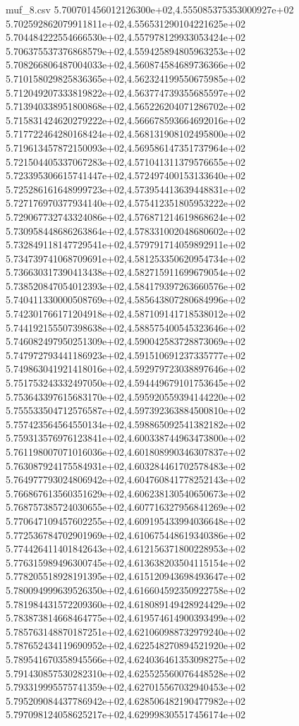 \begin{filecontents*}{muf_8.csv}
5.700701456012126300e+02,4.555085375353000927e+02
5.702592862079911811e+02,4.556531290104221625e+02
5.704484222554666530e+02,4.557978129933053424e+02
5.706375537376868579e+02,4.559425894805963253e+02
5.708266806487004033e+02,4.560874584689736366e+02
5.710158029825836365e+02,4.562324199550675985e+02
5.712049207333819822e+02,4.563774739355685597e+02
5.713940338951800868e+02,4.565226204071286702e+02
5.715831424620279222e+02,4.566678593664692016e+02
5.717722464280168424e+02,4.568131908102495800e+02
5.719613457872150093e+02,4.569586147351737964e+02
5.721504405337067283e+02,4.571041311379576655e+02
5.723395306615741447e+02,4.572497400153133640e+02
5.725286161648999723e+02,4.573954413639448831e+02
5.727176970377934140e+02,4.575412351805953222e+02
5.729067732743324086e+02,4.576871214619868624e+02
5.730958448686263864e+02,4.578331002048680602e+02
5.732849118147729541e+02,4.579791714059892911e+02
5.734739741068709691e+02,4.581253350620954734e+02
5.736630317390413438e+02,4.582715911699679054e+02
5.738520847054012393e+02,4.584179397263660576e+02
5.740411330000508769e+02,4.585643807280684996e+02
5.742301766171204918e+02,4.587109141718538012e+02
5.744192155507398638e+02,4.588575400545323646e+02
5.746082497950251309e+02,4.590042583728873069e+02
5.747972793441186923e+02,4.591510691237335777e+02
5.749863041921418016e+02,4.592979723038897646e+02
5.751753243332497050e+02,4.594449679101753645e+02
5.753643397615683170e+02,4.595920559394144220e+02
5.755533504712576587e+02,4.597392363884500810e+02
5.757423564564550134e+02,4.598865092541382182e+02
5.759313576976123841e+02,4.600338744963473800e+02
5.761198007071016036e+02,4.601808990346307837e+02
5.763087924175584931e+02,4.603284461702578483e+02
5.764977793024806942e+02,4.604760841778252143e+02
5.766867613560351629e+02,4.606238130540650673e+02
5.768757385724030655e+02,4.607716327956841269e+02
5.770647109457602255e+02,4.609195433994036648e+02
5.772536784702901969e+02,4.610675448619340386e+02
5.774426411401842643e+02,4.612156371800228953e+02
5.776315989496300745e+02,4.613638203504115154e+02
5.778205518928191395e+02,4.615120943698493647e+02
5.780094999639526350e+02,4.616604592350922758e+02
5.781984431572209360e+02,4.618089149428924429e+02
5.783873814668464775e+02,4.619574614900393499e+02
5.785763148870187251e+02,4.621060988732979240e+02
5.787652434119690952e+02,4.622548270894521920e+02
5.789541670358945566e+02,4.624036461353098275e+02
5.791430857530282310e+02,4.625525560076448528e+02
5.793319995575741359e+02,4.627015567032940453e+02
5.795209084437786942e+02,4.628506482190477982e+02
5.797098124058625217e+02,4.629998305517456174e+02

\end{filecontents*}

